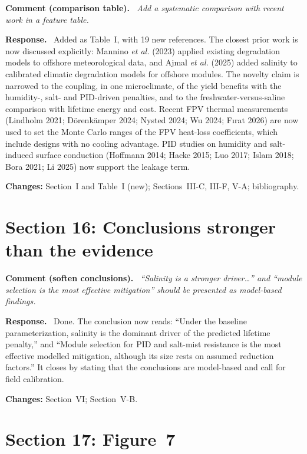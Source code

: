 \documentclass[11pt]{article}
\newcounter{cmt}
\newenvironment{comment}[1]{\refstepcounter{cmt}\par\medskip\noindent\textbf{Comment \thecmt{} (#1).}\itshape\ }{\par}
\newenvironment{response}{\par\noindent\textbf{Response.}\ }{\par}
\newcommand{\change}[1]{\par\noindent\textcolor{blue!50!black}{\textbf{Changes:} #1}\par}
\begin{document}
\begin{comment}{comparison table}
Add a systematic comparison with recent work in a feature table.
\end{comment}
\begin{response}
Added as Table~I, with 19 new references. The closest prior work is now discussed explicitly: Mannino \emph{et al.}
(2023) applied existing degradation models to offshore meteorological data, and Ajmal \emph{et al.} (2025) added
salinity to calibrated climatic degradation models for offshore modules. The novelty claim is narrowed to the coupling,
in one microclimate, of the yield benefits with the humidity-, salt- and PID-driven penalties, and to the
freshwater-versus-saline comparison with lifetime energy and cost. Recent FPV thermal measurements (Lindholm 2021;
D{\"o}renk{\"a}mper 2024; Nysted 2024; Wu 2024; F{\i}rat 2026) are now used to set the Monte Carlo ranges of the FPV
heat-loss coefficients, which include designs with no cooling advantage. PID studies on humidity and salt-induced surface
conduction (Hoffmann 2014; Hacke 2015; Luo 2017; Islam 2018; Bora 2021; Li 2025) now support the leakage term.
\end{response}
\change{Section~I and Table~I (new); Sections~III-C, III-F, V-A; bibliography.}

\section*{Section 16: Conclusions stronger than the evidence}

\begin{comment}{soften conclusions}
``Salinity is a stronger driver\ldots'' and ``module selection is the most effective mitigation'' should be presented as
model-based findings.
\end{comment}
\begin{response}
Done. The conclusion now reads: ``Under the baseline parameterization, salinity is the dominant driver of the predicted
lifetime penalty,'' and ``Module selection for PID and salt-mist resistance is the most effective modelled mitigation,
although its size rests on assumed reduction factors.'' It closes by stating that the conclusions are model-based and
call for field calibration.
\end{response}
\change{Section~VI; Section~V-B.}

\section*{Section 17: Figure~7}
\end{document}
